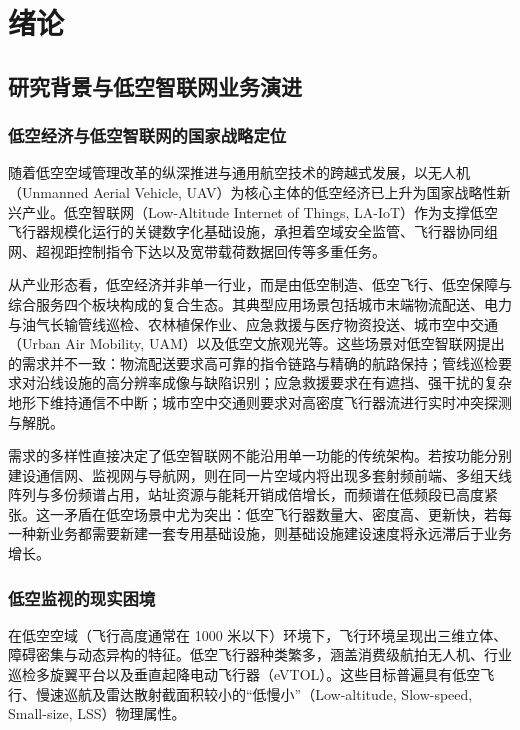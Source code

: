 \chapter{绪论}
\label{chap:intro}

\section{研究背景与低空智联网业务演进}
\label{sec:background}

\subsection{低空经济与低空智联网的国家战略定位}
随着低空空域管理改革的纵深推进与通用航空技术的跨越式发展，以无人机（Unmanned Aerial Vehicle, UAV）为核心主体的低空经济已上升为国家战略性新兴产业。低空智联网（Low-Altitude Internet of Things, LA-IoT）作为支撑低空飞行器规模化运行的关键数字化基础设施，承担着空域安全监管、飞行器协同组网、超视距控制指令下达以及宽带载荷数据回传等多重任务。

从产业形态看，低空经济并非单一行业，而是由低空制造、低空飞行、低空保障与综合服务四个板块构成的复合生态。其典型应用场景包括城市末端物流配送、电力与油气长输管线巡检、农林植保作业、应急救援与医疗物资投送、城市空中交通（Urban Air Mobility, UAM）以及低空文旅观光等。这些场景对低空智联网提出的需求并不一致：物流配送要求高可靠的指令链路与精确的航路保持；管线巡检要求对沿线设施的高分辨率成像与缺陷识别；应急救援要求在有遮挡、强干扰的复杂地形下维持通信不中断；城市空中交通则要求对高密度飞行器流进行实时冲突探测与解脱。

需求的多样性直接决定了低空智联网不能沿用单一功能的传统架构。若按功能分别建设通信网、监视网与导航网，则在同一片空域内将出现多套射频前端、多组天线阵列与多份频谱占用，站址资源与能耗开销成倍增长，而频谱在低频段已高度紧张。这一矛盾在低空场景中尤为突出：低空飞行器数量大、密度高、更新快，若每一种新业务都需要新建一套专用基础设施，则基础设施建设速度将永远滞后于业务增长。

\subsection{低空监视的现实困境}
在低空空域（飞行高度通常在 1000 米以下）环境下，飞行环境呈现出三维立体、障碍密集与动态异构的特征。低空飞行器种类繁多，涵盖消费级航拍无人机、行业巡检多旋翼平台以及垂直起降电动飞行器（eVTOL）。这些目标普遍具有低空飞行、慢速巡航及雷达散射截面积较小的“低慢小”（Low-altitude, Slow-speed, Small-size, LSS）物理属性。

